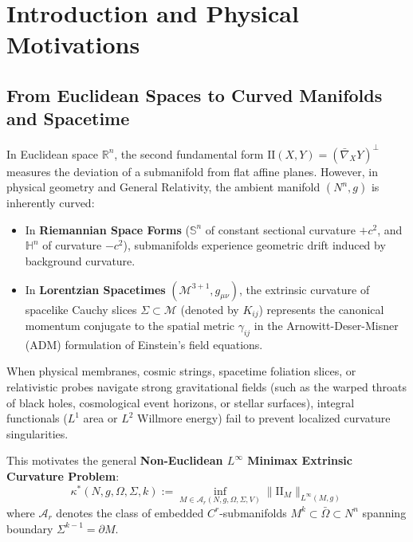 \documentclass[11pt,reqno]{amsart}
\theoremstyle{definition}
\providecommand{\R}{\mathbb{R}}
\providecommand{\Hyp}{\mathbb{H}}
\providecommand{\Sph}{\mathbb{S}}
\providecommand{\II}{\mathrm{I\!I}}
\numberwithin{equation}{section}
\providecommand{\Hyp}{\mathbb{H}}
\providecommand{\Sph}{\mathbb{S}}
\providecommand{\II}{\mathrm{II}}
\providecommand{\R}{\mathbb{R}}
\begin{document}
\maketitle

\tableofcontents
\newpage

\section{Introduction and Physical Motivations}

\subsection{From Euclidean Spaces to Curved Manifolds and Spacetime}
In Euclidean space $\R^n$, the second fundamental form $\II(X,Y) = (\bar{\nabla}_X Y)^\perp$ measures the deviation of a submanifold from flat affine planes. However, in physical geometry and General Relativity, the ambient manifold $(N^n, g)$ is inherently curved:
\begin{itemize}
    \item In \textbf{Riemannian Space Forms} ($\Sph^n$ of constant sectional curvature $+c^2$, and $\Hyp^n$ of curvature $-c^2$), submanifolds experience geometric drift induced by background curvature.
    \item In \textbf{Lorentzian Spacetimes} $(\mathcal{M}^{3+1}, g_{\mu\nu})$, the extrinsic curvature of spacelike Cauchy slices $\Sigma \subset \mathcal{M}$ (denoted by $K_{ij}$) represents the canonical momentum conjugate to the spatial metric $\gamma_{ij}$ in the Arnowitt-Deser-Misner (ADM) formulation of Einstein's field equations.
\end{itemize}

When physical membranes, cosmic strings, spacetime foliation slices, or relativistic probes navigate strong gravitational fields (such as the warped throats of black holes, cosmological event horizons, or stellar surfaces), integral functionals ($L^1$ area or $L^2$ Willmore energy) fail to prevent localized curvature singularities. 

This motivates the general \textbf{Non-Euclidean $L^\infty$ Minimax Extrinsic Curvature Problem}:
\begin{equation}
\label{eq:noneuclidean_problem}
\kappa^*(N, g, \Omega, \Sigma, k) := \inf_{M \in \mathcal{A}_r(N, g, \Omega, \Sigma, V)} \|\II_M\|_{L^\infty(M, g)}
\end{equation}
where $\mathcal{A}_r$ denotes the class of embedded $C^r$-submanifolds $M^k \subset \bar{\Omega} \subset N^n$ spanning boundary $\Sigma^{k-1} = \partial M$.
\end{document}
